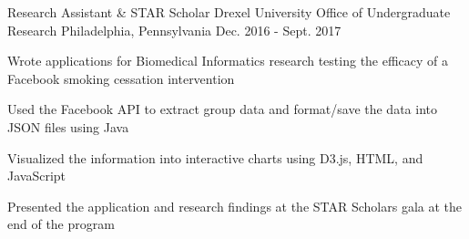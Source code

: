 \begin{cventries}
  \cventry
    {Research Assistant \& STAR Scholar} %
    {Drexel University Office of Undergraduate Research} %
    {Philadelphia, Pennsylvania} %
    {Dec. 2016 - Sept. 2017} %
    {
      \begin{cvitems} %
        \item Wrote applications for Biomedical Informatics research testing the efficacy of a Facebook smoking cessation intervention
        \item Used the Facebook API to extract group data and format/save the data into JSON files using Java
        \item Visualized the information into interactive charts using D3.js, HTML, and JavaScript
        \item Presented the application and research findings at the STAR Scholars gala at the end of the program
      \end{cvitems}
    }

\end{cventries}
